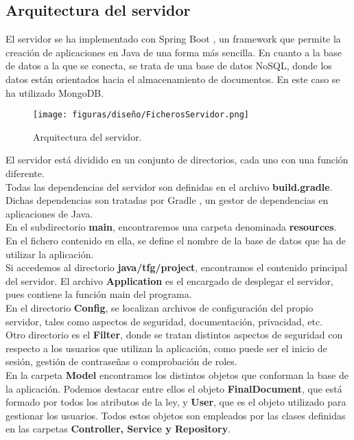 \subsection{Arquitectura  del servidor}

El servidor se ha implementado con Spring Boot \cite{spring}, un framework que permite la creación de aplicaciones en Java de una forma más sencilla. En cuanto a la base de datos a la que se conecta, se trata de una base de datos NoSQL, donde los datos están orientados hacia el almacenamiento de documentos. En este caso se ha utilizado MongoDB.

\begin{figure}[H]
\centerline{\texttt{[image: figuras/diseño/FicherosServidor.png]}}
\caption{Arquitectura del servidor.}
\label{enlaceArquitecturaServidor}
\end{figure}

El servidor está dividido en un conjunto de directorios, cada uno con una función diferente. 
\\

Todas las dependencias del servidor son definidas en el archivo {\bf build.gradle}. Dichas dependencias son tratadas por Gradle \cite{gradle}, un gestor de dependencias en aplicaciones de Java.
\\

En el subdirectorio {\bf main}, encontraremos una carpeta denominada {\bf resources}. En el fichero contenido en ella, se define el nombre de la base de datos que ha de utilizar la aplicación.
\\

Si accedemos al directorio {\bf java/tfg/project}, encontramos el contenido principal del servidor. El archivo {\bf Application} es el encargado de desplegar el servidor, pues contiene la función main del programa.
\\

En el directorio {\bf Config}, se localizan archivos de configuración del propio servidor, tales como aspectos de seguridad, documentación, privacidad, etc. 
\\

Otro directorio es el {\bf Filter}, donde se tratan distintos aspectos de seguridad con respecto a los usuarios que utilizan la aplicación, como puede ser el inicio de sesión, gestión de contraseñas o comprobación de roles.
\\

En la carpeta {\bf Model} encontramos los distintos objetos que conforman la base de la aplicación. Podemos destacar entre ellos el objeto {\bf FinalDocument}, que está formado por todos los atributos de la ley, y {\bf User}, que es el objeto utilizado para gestionar los usuarios. Todos estos objetos son empleados por las clases definidas en las carpetas {\bf Controller, Service y Repository}.
\\

